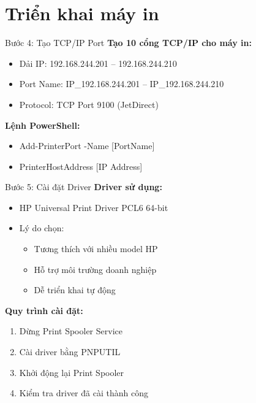 \documentclass{beamer}
\begin{document}
    \section{Triển khai máy in}
    \begin{frame}{Bước 4: Tạo TCP/IP Port}
        \textbf{Tạo 10 cổng TCP/IP cho máy in:}
        \begin{itemize}
            \item Dải IP: 192.168.244.201 – 192.168.244.210
            \item Port Name: IP\_192.168.244.201 – IP\_192.168.244.210
            \item Protocol: TCP Port 9100 (JetDirect)
        \end{itemize}
        
        \vspace{0.3cm}
        \textbf{Lệnh PowerShell:}
        \begin{itemize}
            \item Add-PrinterPort -Name [PortName]
            \item PrinterHostAddress [IP Address]
        \end{itemize}
    \end{frame}
    
    \begin{frame}{Bước 5: Cài đặt Driver}
        \textbf{Driver sử dụng:}
        \begin{itemize}
            \item HP Universal Print Driver PCL6 64-bit
            \item Lý do chọn:
                \begin{itemize}
                    \item Tương thích với nhiều model HP
                    \item Hỗ trợ môi trường doanh nghiệp
                    \item Dễ triển khai tự động
                \end{itemize}
        \end{itemize}
        
        \vspace{0.3cm}
        \textbf{Quy trình cài đặt:}
        \begin{enumerate}
            \item Dừng Print Spooler Service
            \item Cài driver bằng PNPUTIL
            \item Khởi động lại Print Spooler
            \item Kiểm tra driver đã cài thành công
        \end{enumerate}
    \end{frame}
    
\end{document}
